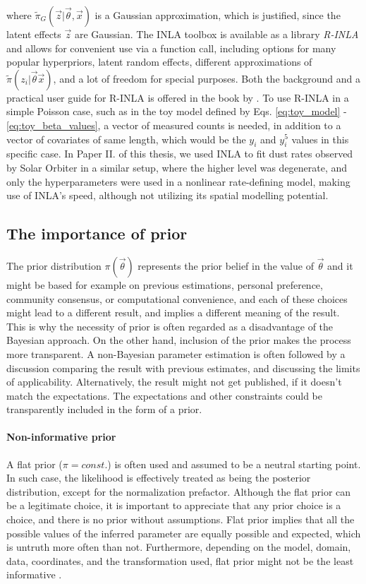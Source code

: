 where $\tilde{\pi}_G(\vec{z}|\vec{\theta},\vec{x})$ is a Gaussian approximation, which is justified, since the latent effects $\vec{z}$ are Gaussian. The INLA toolbox is available as a library \textit{R-INLA} \citep{rinla} and allows for convenient use via a function call, including options for many popular hyperpriors, latent random effects, different approximations of $\tilde{\pi}(z_i|\vec{\theta} \vec{x})$, and a lot of freedom for special purposes. Both the background and a practical user guide for R-INLA is offered in the book by \citet{gomez2020bayesian}. To use R-INLA in a simple Poisson case, such as in the toy model defined by Eqs. \ref{eq:toy_model} - \ref{eq:toy_beta_values}, a vector of measured counts is needed, in addition to a vector of covariates of same length, which would be the $y_i$ and $y_i^5$ values in this specific case. In Paper II. of this thesis, we used INLA to fit dust rates observed by Solar Orbiter in a similar setup, where the higher level was degenerate, and only the hyperparameters were used in a nonlinear rate-defining model, making use of INLA's speed, although not utilizing its spatial modelling potential. 

\subsection{The importance of prior}

The prior distribution $\pi(\vec{\theta})$ represents the prior belief in the value of $\vec{\theta}$ and it might be based for example on previous estimations, personal preference, community consensus, or computational convenience, and each of these choices might lead to a different result, and implies a different meaning of the result. This is why the necessity of prior is often regarded as a disadvantage of the Bayesian approach. On the other hand, inclusion of the prior makes the process more transparent. A non-Bayesian parameter estimation is often followed by a discussion comparing the result with previous estimates, and discussing the limits of applicability. Alternatively, the result might not get published, if it doesn't match the expectations. The expectations and other constraints could be transparently included in the form of a prior.

\paragraph{Non-informative prior} A flat prior ($\pi = const.$) is often used and assumed to be a neutral starting point. In such case, the likelihood is effectively treated as being the posterior distribution, except for the normalization prefactor. Although the flat prior can be a legitimate choice, it is important to appreciate that any prior choice is a choice, and there is no prior without assumptions. Flat prior implies that all the possible values of the inferred parameter are equally possible and expected, which is untruth more often than not. Furthermore, depending on the model, domain, data, coordinates, and the transformation used, flat prior might not be the least informative \citep{lemoine2019moving}.

